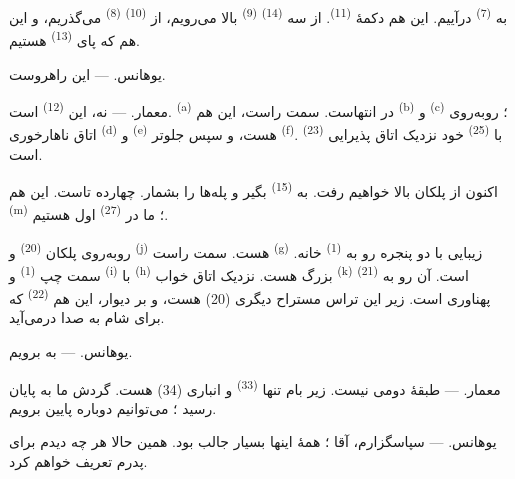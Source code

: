 به  \textsuperscript{(7)} درآییم. این هم دکمهٔ
 \textsuperscript{(11)}. از سه 
\textsuperscript{(14)}  \textsuperscript{(9)} بالا
می‌رویم، از  \textsuperscript{(10)} 
\textsuperscript{(8)} می‌گذریم، و این هم که پای 
\textsuperscript{(13)} هستیم.

\textsc{یوهانس}. --- این راهروست.

\textsc{معمار}. --- نه، این  \textsuperscript{(12)} است.
 \textsuperscript{(a)} در انتهاست. سمت راست، این هم
 \textsuperscript{(b)} و 
\textsuperscript{(c)} ؛ روبه‌روی اتاق ناهارخوری 
\textsuperscript{(d)} و  \textsuperscript{(e)}
هست، و سپس جلوتر  \textsuperscript{(f)}.
 \textsuperscript{(23)} با 
\textsuperscript{(25)} خود نزدیک اتاق پذیرایی است.

اکنون از پلکان بالا خواهیم رفت. به 
\textsuperscript{(15)} بگیر و پله‌ها را بشمار. چهارده تاست. این هم
 \textsuperscript{(m)} ؛ ما در 
\textsuperscript{(27)} اول هستیم.

\VUsaut{3.0mm}
\VUsaut{3.0mm}

روبه‌روی پلکان  \textsuperscript{(20)} و  \textsuperscript{(j)} هست. سمت راست 
\textsuperscript{(g)} زیبایی با دو پنجره رو به 
\textsuperscript{(1)} خانه. سمت چپ  \textsuperscript{(1)}
و  \textsuperscript{(i)} با 
\textsuperscript{(h)} بزرگ هست. نزدیک اتاق خواب 
\textsuperscript{(k)} است. آن رو به  \textsuperscript{(21)}
پهناوری است. زیر این تراس مستراح دیگری (20) هست، و بر دیوار، این هم
 \textsuperscript{(22)} که برای شام به صدا درمی‌آید.

\textsc{یوهانس}. --- به  برویم.

\textsc{معمار}. --- طبقهٔ دومی نیست. زیر بام تنها  \textsuperscript{(33)} و انباری (34) هست. گردش ما به پایان
رسید ؛ می‌توانیم دوباره پایین برویم.

\textsc{یوهانس}. --- سپاسگزارم، آقا ؛ همهٔ اینها بسیار جالب بود. همین
حالا هر چه دیدم برای پدرم تعریف خواهم کرد.

\VUsaut{4.0mm}
\VUfilet{22mm}
